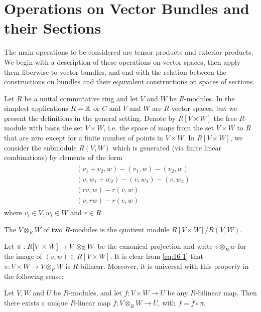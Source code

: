 \newcommand{\otr}[1][R]{\otimes_#1}%
\chapter{Operations on Vector Bundles and their Sections}
The main operations to be considered are tensor products and exterior products.
We begin with a description of these operations on vector spaces, then apply them
fiberwise to vector bundles, and end with the relation between the constructions
on bundles and their equivalent constructions on spaces of sections.


Let $R$ be a unital commutative ring and let $V$ and $W$ be $R$-modules. In the simplest
applications $R = {\mathbb{R}}$ or $C$ and $V$ and $W$ are $R$-vector spaces, but we present the
definitions in the general setting. Denote by $R[V\times W]$ the free $R$-module with
basis the set $V\times W$, i.e. the space of maps from the set $V\times W$ to $R$ that are
zero except for a finite number of points in $V\times W$. In $R[V\times W]$, we consider
the submodule $R(V, W)$ which is generated (via finite linear combinations) by
elements of the form
\begin{align}\label{eq:16-1}
  \begin{aligned}
    & (v_1+v_2, w) - (v_1, w) - (v_2, w) \\
    & (v, w_1+w_2) - (v, w_1) - (v, w_2) \\
    & (rv, w) - r(v, w)\\
    & (v, rw) - r(v, w)
  \end{aligned}
\end{align}
where $v_i\in V, w_i\in W$ and $r\in R$.

\begin{definition}\label{definition:16-1}
  The  $V\otimes_{R} W$ of two $R$-modules is the quotient module $R[V\times W]/R(V, W)$.
\end{definition}

Let $\pi: R[V\times W]\to V \otimes_{\mathbb{R}} W$ be the canonical projection and write $v\otimes_R w$ for
the image of $(v, w)\in R[V\times W]$. It is clear from \eqref{eq:16-1} that $\pi:V\times W\to V\otimes_R W$
is $R$-bilinear. Moreover, it is universal with this property in the following sense:

\begin{lemma}\label{lemma:16-2}
  Let $V, W$ and $U$ be $R$-modules, and let $f: V\times W\to U$ be any
  $R$-bilinear map. Then there exists a unique $R$-linear map $\overline{f}:V\otimes_R W\to U$, with
  $f = \overline{f}\circ \pi$.
\end{lemma}

